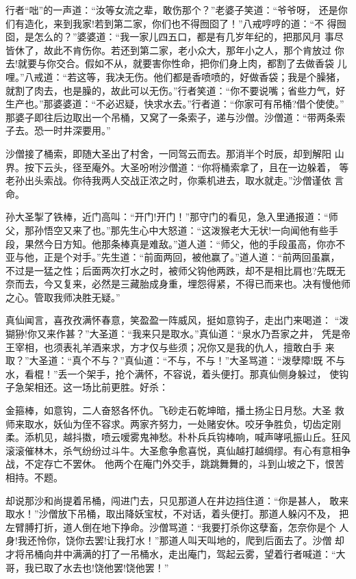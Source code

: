 行者“咄”的一声道：“汝等女流之辈，敢伤那个？”老婆子笑道：“爷爷呀，
还是你们有造化，来到我家!若到第二家，你们也不得囫囵了！”八戒哼哼的道：“不
得囫囵，是怎么的？”婆婆道：“我一家儿四五口，都是有几岁年纪的，把那风月
事尽皆休了，故此不肯伤你。若还到第二家，老小众大，那年小之人，那个肯放过
你去!就要与你交合。假如不从，就要害你性命，把你们身上肉，都割了去做香袋
儿哩。”八戒道：“若这等，我决无伤。他们都是香喷喷的，好做香袋；我是个臊猪，
就割了肉去，也是臊的，故此可以无伤。”行者笑道：“你不要说嘴；省些力气，好
生产也。”那婆婆道：“不必迟疑，快求水去。”行者道：“你家可有吊桶?借个使使。”
那婆子即往后边取出一个吊桶，又窝了一条索子，递与沙僧。沙僧道：“带两条索
子去。恐一时井深要用。”

沙僧接了桶索，即随大圣出了村舍，一同驾云而去。那消半个时辰，却到解阳
山界。按下云头，径至庵外。大圣吩咐沙僧道：“你将桶索拿了，且在一边躲着，
等老孙出头索战。你待我两人交战正浓之时，你乘机进去，取水就走。”沙僧谨依
言命。

孙大圣掣了铁棒，近门高叫：“开门!开门！”那守门的看见，急入里通报道：“师
父，那孙悟空又来了也。”那先生心中大怒道：“这泼猴老大无状!一向闻他有些手
段，果然今日方知。他那条棒真是难敌。”道人道：“师父，他的手段虽高，你亦不
亚与他，正是个对手。”先生道：“前面两回，被他赢了。”道人道：“前两回虽赢，
不过是一猛之性；后面两次打水之时，被师父钩他两跌，却不是相比肩也?先既无
奈而去，今又复来，必然是三藏胎成身重，埋怨得紧，不得已而来也。决有慢他师
之心。管取我师决胜无疑。”

真仙闻言，喜孜孜满怀春意，笑盈盈一阵威风，挺如意钩子，走出门来喝道：
“泼猢狲!你又来作甚？”大圣道：“我来只是取水。”真仙道：“泉水乃吾家之井，
凭是帝王宰相，也须表礼羊酒来求，方才仅与些须；况你又是我的仇人，擅敢白手
来取？”大圣道：“真个不与？”真仙道：“不与，不与！”大圣骂道：“泼孽障!既
不与水，看棍！”丢一个架手，抢个满怀，不容说，着头便打。那真仙侧身躲过，
使钩子急架相还。这一场比前更胜。好杀：

金箍棒，如意钩，二人奋怒各怀仇。飞砂走石乾坤暗，播土扬尘日月愁。大圣
救师来取水，妖仙为侄不容求。两家齐努力，一处赌安休。咬牙争胜负，切齿定刚
柔。添机见，越抖擞，喷云嗳雾鬼神愁。朴朴兵兵钩棒响，喊声哮吼振山丘。狂风
滚滚催林木，杀气纷纷过斗牛。大圣愈争愈喜悦，真仙越打越绸缪。有心有意相争
战，不定存亡不罢休。
他两个在庵门外交手，跳跳舞舞的，斗到山坡之下，恨苦相持。不题。

却说那沙和尚提着吊桶，闯进门去，只见那道人在井边挡住道：“你是甚人，
敢来取水！”沙僧放下吊桶，取出降妖宝杖，不对话，着头便打。那道人躲闪不及，
把左臂膊打折，道人倒在地下挣命。沙僧骂道：“我要打杀你这孽畜，怎奈你是个
人身!我还怜你，饶你去罢!让我打水！”那道人叫天叫地的，爬到后面去了。沙僧
却才将吊桶向井中满满的打了一吊桶水，走出庵门，驾起云雾，望着行者喊道：“大
哥，我已取了水去也!饶他罢!饶他罢！”

